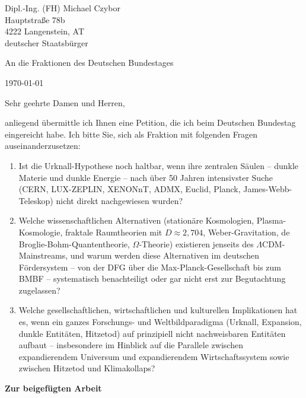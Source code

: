 \documentclass[11pt,a4paper]{letter}
\begin{document}
\begin{letter}

Dipl.-Ing. (FH) Michael Czybor \\ Hauptstraße 78b \\ 4222 Langenstein, AT \\ deutscher Staatsbürger

\vspace{0.5cm}

An die Fraktionen des Deutschen Bundestages

\begin{flushright}
	\today
\end{flushright}

\vspace{0.5cm}

Sehr geehrte Damen und Herren,

anliegend übermittle ich Ihnen eine Petition, die ich beim Deutschen Bundestag eingereicht habe. Ich bitte Sie, sich als Fraktion mit folgenden Fragen auseinanderzusetzen:

\begin{enumerate}
    \item Ist die Urknall-Hypothese noch haltbar, wenn ihre zentralen Säulen – dunkle Materie und dunkle Energie – nach über 50 Jahren intensivster Suche (CERN, LUX-ZEPLIN, XENONnT, ADMX, Euclid, Planck, James-Webb-Teleskop) nicht direkt nachgewiesen wurden?
    
    \item Welche wissenschaftlichen Alternativen (stationäre Kosmologien, Plasma-Kosmologie, fraktale Raumtheorien mit $D \approx 2,704$, Weber-Gravitation, de Broglie-Bohm-Quantentheorie, $\Omega$-Theorie) existieren jenseits des $\Lambda$CDM-Mainstreams, und warum werden diese Alternativen im deutschen Fördersystem – von der DFG über die Max-Planck-Gesellschaft bis zum BMBF – systematisch benachteiligt oder gar nicht erst zur Begutachtung zugelassen?
    
    \item Welche gesellschaftlichen, wirtschaftlichen und kulturellen Implikationen hat es, wenn ein ganzes Forschungs- und Weltbildparadigma (Urknall, Expansion, dunkle Entitäten, Hitzetod) auf prinzipiell nicht nachweisbaren Entitäten aufbaut – insbesondere im Hinblick auf die Parallele zwischen expandierendem Universum und expandierendem Wirtschaftssystem sowie zwischen Hitzetod und Klimakollaps?
\end{enumerate}

\noindent
\textbf{Zur beigefügten Arbeit}


\end{letter}
\end{document}
